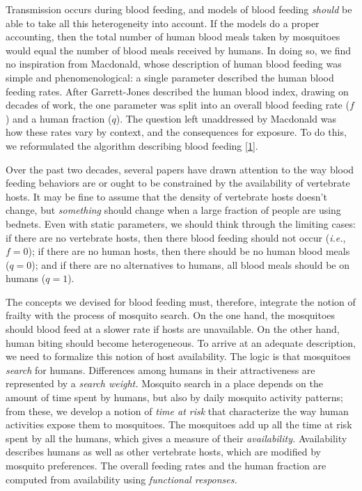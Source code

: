 \documentclass[
]{book}
\begin{document}
Transmission occurs during blood feeding, and models of blood feeding \emph{should} be able to take all this heterogeneity into account. If the models do a proper accounting, then the total number of human blood meals taken by mosquitoes would equal the number of blood meals received by humans. In doing so, we find no inspiration from Macdonald, whose description of human blood feeding was simple and phenomenological: a single parameter described the human blood feeding rates. After Garrett-Jones described the human blood index, drawing on decades of work, the one parameter was split into an overall blood feeding rate (\(f\)) and a human fraction (\(q\)). The question left unaddressed by Macdonald was how these rates vary by context, and the consequences for exposure. To do this, we reformulated the algorithm describing blood feeding {[}\protect\hyperlink{ref-WuSL2022SpatialDynamics}{1}{]}.

Over the past two decades, several papers have drawn attention to the way blood feeding behaviors are or ought to be constrained by the availability of vertebrate hosts. It may be fine to assume that the density of vertebrate hosts doesn't change, but \emph{something} should change when a large fraction of people are using bednets. Even with static parameters, we should think through the limiting cases: if there are no vertebrate hosts, then there blood feeding should not occur (\emph{i.e.}, \(f=0\)); if there are no human hosts, then there should be no human blood meals (\(q=0\)); and if there are no alternatives to humans, all blood meals should be on humans (\(q=1\)).

The concepts we devised for blood feeding must, therefore, integrate the notion of frailty with the process of mosquito search. On the one hand, the mosquitoes should blood feed at a slower rate if hosts are unavailable. On the other hand, human biting should become heterogeneous. To arrive at an adequate description, we need to formalize this notion of host availability.
The logic is that mosquitoes \emph{search} for humans. Differences among humans in their attractiveness are represented by a \emph{search weight.} Mosquito search in a place depends on the amount of time spent by humans, but also by daily mosquito activity patterns; from these, we develop a notion of \emph{time at risk} that characterize the way human activities expose them to mosquitoes. The mosquitoes add up all the time at risk spent by all the humans, which gives a measure of their \emph{availability.} Availability describes humans as well as other vertebrate hosts, which are modified by mosquito preferences. The overall feeding rates and the human fraction are computed from availability using \emph{functional responses.}
\end{document}
